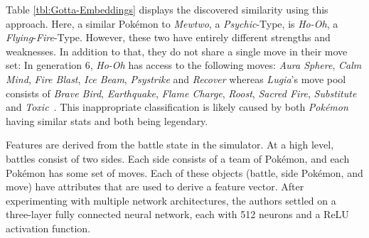 Table \ref{tbl:Gotta-Embeddings} displays the discovered similarity using this approach. Here, a similar Pokémon
to \textit{Mewtwo}, a \textit{Psychic}-Type, is \textit{Ho-Oh}, a \textit{Flying}-\textit{Fire}-Type. However,
these two have entirely different strengths and weaknesses. In addition to that, they do not share a single
move in their move set: 
In generation 6, \textit{Ho-Oh} has access to the following moves: \textit{Aura Sphere}, \textit{Calm Mind}, 
\textit{Fire Blast}, \textit{Ice Beam}, \textit{Psystrike} and \textit{Recover} whereas \textit{Lugia}'s
move pool consists of \textit{Brave Bird}, \textit{Earthquake}, \textit{Flame Charge}, \textit{Roost},
\textit{Sacred Fire}, \textit{Substitute} and \textit{Toxic}~\autocite{DamageCalc:Gen6}. This inappropriate
classification is likely caused by both \textit{Pokémon} having similar stats and both being legendary.

Features are derived from the battle state in the simulator. At a high level, battles consist of two
sides. Each side consists of a team of Pokémon, and each Pokémon has some set of moves. Each of these 
objects (battle, side Pokémon, and move) have attributes that are used to derive a feature vector.
After experimenting with multiple network architectures, the authors settled on a three-layer 
fully connected neural network, each with 512 neurons and a ReLU activation function.

